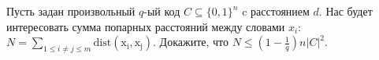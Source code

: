 Пусть задан произвольный $q$-ый код $C \subseteq \{0, 1\}^n$ c расстоянием $d$. Нас будет интересовать сумма попарных
расстояний между словами $x_i$: $N = \sum\limits_{1 \le i \neq j \le m} \mathrm{dist(x_i, x_j)}$. Докажите, что $N \le (1 -
\frac{1}{q}) n |C|^2$.